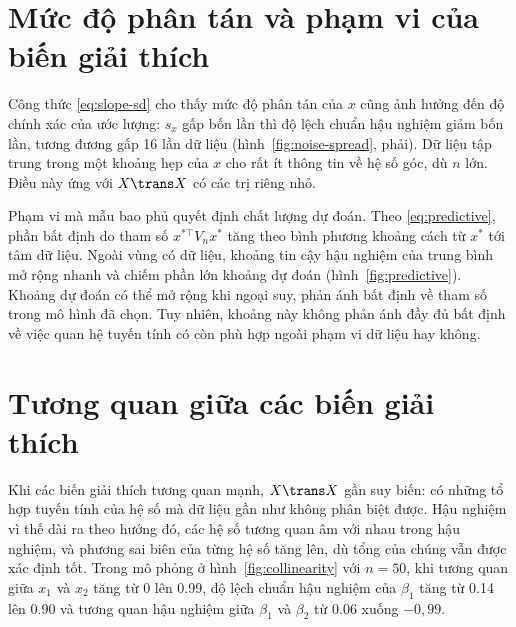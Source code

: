 \documentclass[12pt,a4paper]{report}
\begin{document}

\section{Mức độ phân tán và phạm vi của biến giải thích}
\label{sec:dep-spread}

Công thức \eqref{eq:slope-sd} cho thấy mức độ phân tán của $x$ cũng ảnh hưởng
đến độ chính xác của ước lượng: $s_x$ gấp bốn lần thì độ lệch chuẩn hậu nghiệm giảm bốn lần, tương đương
gấp 16 lần dữ liệu (hình~\ref{fig:noise-spread}, phải). Dữ liệu tập trung trong
một khoảng hẹp của $x$ cho rất ít thông tin về hệ số góc, dù $n$ lớn. Điều này
ứng với $X\trans X$ có các trị riêng nhỏ.

Phạm vi mà mẫu bao phủ quyết định chất lượng dự đoán. Theo \eqref{eq:predictive},
phần bất định do tham số $x^{\ast\top} V_n x^\ast$ tăng theo bình phương khoảng
cách từ $x^\ast$ tới tâm dữ liệu. Ngoài vùng có dữ liệu, khoảng tin cậy hậu nghiệm của trung
bình mở rộng nhanh và chiếm phần lớn khoảng dự đoán (hình~\ref{fig:predictive}).
Khoảng dự đoán có thể mở rộng khi ngoại suy, phản ánh bất định về tham số
trong mô hình đã chọn. Tuy nhiên, khoảng này không phản ánh đầy đủ bất định về
việc quan hệ tuyến tính có còn phù hợp ngoài phạm vi dữ liệu hay không.


\section{Tương quan giữa các biến giải thích}
\label{sec:dep-collinear}

Khi các biến giải thích tương quan mạnh, $X\trans X$ gần suy biến: có những tổ
hợp tuyến tính của hệ số mà dữ liệu gần như không phân biệt được. Hậu nghiệm vì
thế dài ra theo hướng đó, các hệ số tương quan âm với nhau trong hậu nghiệm, và
phương sai biên của từng hệ số tăng lên, dù tổng của chúng vẫn được xác định tốt.
Trong mô phỏng ở hình~\ref{fig:collinearity} với $n = 50$, khi tương quan giữa
$x_1$ và $x_2$ tăng từ 0 lên \num{0.99}, độ lệch chuẩn hậu nghiệm của $\beta_1$
tăng từ \num{0.14} lên \num{0.90} và tương quan hậu nghiệm giữa $\beta_1$ và
$\beta_2$ từ \num{0.06} xuống $-0{,}99$.
\end{document}
